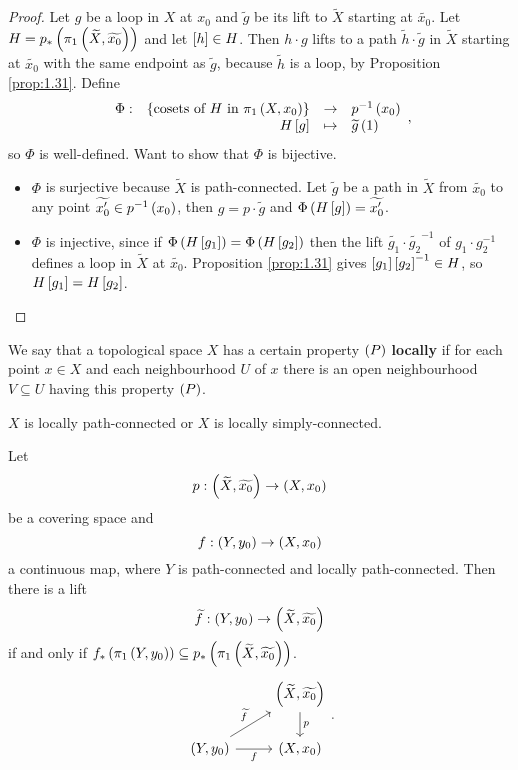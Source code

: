 \begin{proof}
Let $ g $ be a loop in $ X $ at $ x_0 $ and $ \widetilde{g} $ be its lift to $ \widetilde{X} $ starting at $ \widetilde{x_0} $. Let $ H = p_*\rb{\pi_1\rb{\widetilde{X}, \widetilde{x_0}}} $ and let $ \sb{h} \in H $. Then $ h \cdot g $ lifts to a path $ \widetilde{h} \cdot \widetilde{g} $ in $ \widetilde{X} $ starting at $ \widetilde{x_0} $ with the same endpoint as $ \widetilde{g} $, because $ \widetilde{h} $ is a loop, by Proposition \ref{prop:1.31}. Define
$$ \function[\Phi]{\cb{\text{cosets of} \ H \ \text{in} \ \pi_1\rb{X, x_0}}}{p^{-1}\rb{x_0}}{H\sb{g}}{\widetilde{g}\rb{1}}, $$
so $ \Phi $ is well-defined. Want to show that $ \Phi $ is bijective.
\begin{itemize}
\item $ \Phi $ is surjective because $ \widetilde{X} $ is path-connected. Let $ \widetilde{g} $ be a path in $ \widetilde{X} $ from $ \widetilde{x_0} $ to any point $ \widetilde{x_0'} \in p^{-1}\rb{x_0} $, then $ g = p \cdot \widetilde{g} $ and $ \Phi\rb{H\sb{g}} = \widetilde{x_0'} $.
\item $ \Phi $ is injective, since if $ \Phi\rb{H\sb{g_1}} = \Phi\rb{H\sb{g_2}} $ then the lift $ \widetilde{g_1} \cdot \widetilde{g_2}^{-1} $ of $ g_1 \cdot g_2^{-1} $ defines a loop in $ \widetilde{X} $ at $ \widetilde{x_0} $. Proposition \ref{prop:1.31} gives $ \sb{g_1}\sb{g_2}^{-1} \in H $, so $ H\sb{g_1} = H\sb{g_2} $.
\end{itemize}
\end{proof}

We say that a topological space $ X $ has a certain property $ \rb{P} $ \textbf{locally} if for each point $ x \in X $ and each neighbourhood $ U $ of $ x $ there is an open neighbourhood $ V \subseteq U $ having this property $ \rb{P} $.

\begin{example*}
$ X $ is locally path-connected or $ X $ is locally simply-connected.
\end{example*}

\begin{proposition}
\label{prop:1.33}
Let
$$ p : \rb{\widetilde{X}, \widetilde{x_0}} \to \rb{X, x_0} $$
be a covering space and
$$ f : \rb{Y, y_0} \to \rb{X, x_0} $$
a continuous map, where $ Y $ is path-connected and locally path-connected. Then there is a lift
$$ \widetilde{f} : \rb{Y, y_0} \to \rb{\widetilde{X}, \widetilde{x_0}} $$
if and only if $ f_*\rb{\pi_1\rb{Y, y_0}} \subseteq p_*\rb{\pi_1\rb{\widetilde{X}, \widetilde{x_0}}} $.
$$
\begin{tikzcd}
& \rb{\widetilde{X}, \widetilde{x_0}} \arrow{d}{p} \\
\rb{Y, y_0} \arrow{ur}{\widetilde{f}} \arrow[swap]{r}{f} & \rb{X, x_0}
\end{tikzcd}.
$$
\end{proposition}

